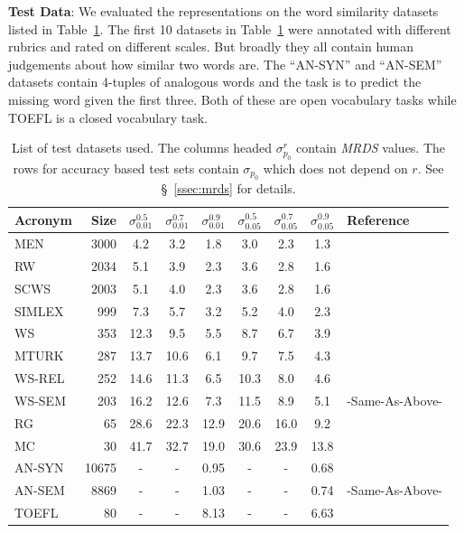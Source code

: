 \documentclass[11pt]{article}
\begin{document}
\noindent\textbf{Test Data}: We evaluated the representations on the
word similarity datasets listed in Table~\ref{tab:testlist}. The first
10 datasets in Table~\ref{tab:testlist} were annotated with different
rubrics and rated on different scales. But broadly they all
contain human judgements about how similar two words are.
The ``AN-SYN'' and ``AN-SEM'' datasets contain 4-tuples of
analogous words and the task is to predict the missing word given the
first three. Both of these are  open vocabulary tasks while TOEFL is a closed
vocabulary task. 
\begin{table}[ht]
  \centering
  \begin{tabular}{lr | ccc  | ccc | l}
    Acronym & Size  &
    $\sigma_{0.01}^{0.5}$ & $\sigma_{0.01}^{0.7}$ & $\sigma_{0.01}^{0.9}$ &
    $\sigma_{0.05}^{0.5}$ & $\sigma_{0.05}^{0.7}$ & $\sigma_{0.05}^{0.9}$ &
    Reference  \\ 
    \hline

    MEN    & 3000  & 4.2  & 3.2  & 1.8  & 3.0  & 2.3  & 1.3  & \cite{bruni2012distributional}  \\
    RW     & 2034  & 5.1  & 3.9  & 2.3  & 3.6  & 2.8  & 1.6  & \cite{Luong2013morpho}          \\
    SCWS   & 2003  & 5.1  & 4.0  & 2.3  & 3.6  & 2.8  & 1.6  & \cite{Huang2012Improving}       \\
    SIMLEX & 999   & 7.3  & 5.7  & 3.2  & 5.2  & 4.0  & 2.3  & \cite{hill2014simlex}           \\
    WS     & 353   & 12.3 & 9.5  & 5.5  & 8.7  & 6.7  & 3.9  & \cite{finkelstein2001placing}   \\
    MTURK  & 287   & 13.7 & 10.6 & 6.1  & 9.7  & 7.5  & 4.3  & \cite{Radinsky2011word}         \\
    WS-REL & 252   & 14.6 & 11.3 & 6.5  & 10.3 & 8.0  & 4.6  & \cite{agirre2009study}          \\
    WS-SEM & 203   & 16.2 & 12.6 & 7.3  & 11.5 & 8.9  & 5.1  & -Same-As-Above-                 \\
    RG     & 65    & 28.6 & 22.3 & 12.9 & 20.6 & 16.0 & 9.2  & \cite{Rubenstein1965Contextual} \\
    MC     & 30    & 41.7 & 32.7 & 19.0 & 30.6 & 23.9 & 13.8 & \cite{miller1991contextual}     \\ \hline
    AN-SYN  & 10675 & -    & -    & 0.95 & -    & -    & 0.68 & \cite{mikolov2013distributed}   \\
    AN-SEM  & 8869  & -    & -    & 1.03 & -    & -    & 0.74 & -Same-As-Above-                 \\
    TOEFL  & 80    & -    & -    & 8.13 & -    & -    & 6.63 & \cite{landauer1997solution}
  \end{tabular}
  \caption{List of test datasets used. The columns headed $\sigma_{p_0}^r$ contain 
    \emph{MRDS}
    values. The rows for accuracy based test sets contain
    $\sigma_{p_0}$ which does not depend on $r$. See
    \S~\ref{ssec:mrds} for details.}
   \label{tab:testlist}
\end{table}
\end{document}
